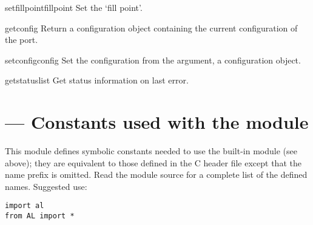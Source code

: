 \begin{methoddesc}{setfillpoint}{fillpoint}
Set the `fill point'.
\end{methoddesc}

\begin{methoddesc}{getconfig}{}
Return a configuration object containing the current configuration of
the port.
\end{methoddesc}

\begin{methoddesc}{setconfig}{config}
Set the configuration from the argument, a configuration object.
\end{methoddesc}

\begin{methoddesc}{getstatus}{list}
Get status information on last error.
\end{methoddesc}


\section{ ---
         Constants used with the  module}



This module defines symbolic constants needed to use the built-in
module  (see above); they are equivalent to those defined
in the C header file  except that the name prefix
 is omitted.  Read the module source for a complete list of
the defined names.  Suggested use:

\begin{verbatim}
import al
from AL import *
\end{verbatim}
